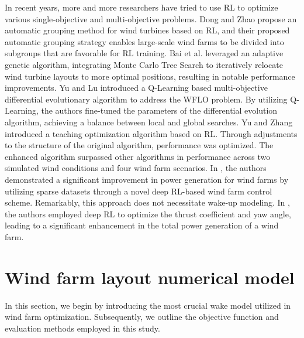 \documentclass[review]{elsarticle}
\begin{document}
In recent years, more and more researchers have tried to use RL to optimize various single-objective and multi-objective problems. Dong and Zhao \cite{dong2023reinforcement} propose an automatic grouping method for wind turbines based on RL, and their proposed automatic grouping strategy enables large-scale wind farms to be divided into subgroups that are favorable for RL training. Bai et al. \cite{bai2022wind} leveraged an adaptive genetic algorithm, integrating Monte Carlo Tree Search to iteratively relocate wind turbine layouts to more optimal positions, resulting in notable performance improvements. Yu and Lu \cite{yu2023reinforcement} introduced a Q-Learning based multi-objective differential evolutionary algorithm to address the WFLO problem. By utilizing Q-Learning, the authors fine-tuned the parameters of the differential evolution algorithm, achieving a balance between local and global searches. Yu and Zhang \cite{yu2023teaching} introduced a teaching optimization algorithm based on RL. Through adjustments to the structure of the original algorithm, performance was optimized. The enhanced algorithm surpassed other algorithms in performance across two simulated wind conditions and four wind farm scenarios. In \cite{dong2021intelligent}, the authors demonstrated a significant improvement in power generation for wind farms by utilizing sparse datasets through a novel deep RL-based wind farm control scheme. Remarkably, this approach does not necessitate wake-up modeling. In \cite{xie2021wind}, the authors employed deep RL to optimize the thrust coefficient and yaw angle, leading to a significant enhancement in the total power generation of a wind farm.

\section{Wind farm layout numerical model}\label{wflonm}
In this section, we begin by introducing the most crucial wake model utilized in wind farm optimization. Subsequently, we outline the objective function and evaluation methods employed in this study.
\end{document}
